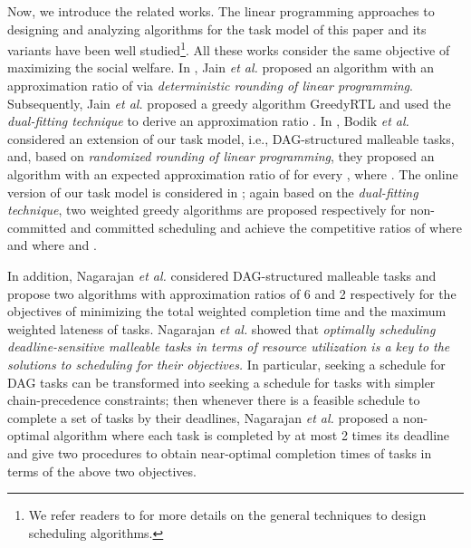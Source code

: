 \documentclass[10pt,journal,compsoc]{IEEEtran}
\begin{document}
Now, we introduce the related works.
The linear programming approaches to designing and analyzing algorithms for the task model of this paper \cite{Jain11a,Jain} and its variants \cite{Lucier,Bodik,Azar} have been well studied\footnote{We refer readers to \cite{Karger,Williamson} for more details on the general techniques to design scheduling algorithms.}. All these works consider the same objective of maximizing the social welfare. In \cite{Jain11a}, Jain {\em et al.} proposed an algorithm with an approximation ratio of  via {\em deterministic rounding of linear programming}. Subsequently, Jain {\em et al.} \cite{Jain} proposed a greedy algorithm GreedyRTL and used the {\em dual-fitting technique} to derive an approximation ratio .
In \cite{Bodik}, Bodik {\em et al.} considered an extension of our task model, i.e., DAG-structured malleable tasks, and, based on {\em randomized rounding of linear programming}, they proposed an algorithm with an expected approximation ratio of  for every , where . The online version of our task model is considered in \cite{Lucier,Azar}; again based on the {\em dual-fitting technique}, two weighted greedy algorithms are proposed respectively for non-committed and committed scheduling and achieve the competitive ratios of  where  \cite{Jain} and  where  and .



In addition, Nagarajan {\em et al.} \cite{Nagarajan} considered DAG-structured malleable tasks and propose two algorithms with approximation ratios of 6 and 2 respectively for the objectives of minimizing the total weighted completion time and the maximum weighted lateness of tasks. Nagarajan {\em et al.} showed that {\em optimally scheduling deadline-sensitive malleable tasks in terms of resource utilization is a key to the solutions to scheduling for their objectives.} In particular, seeking a schedule for DAG tasks can be transformed into seeking a schedule for tasks with simpler chain-precedence constraints; then whenever there is a feasible schedule to complete a set of tasks by their deadlines, Nagarajan {\em et al.} proposed a non-optimal algorithm where each task is completed by at most 2 times its deadline and give two procedures to obtain near-optimal completion times of tasks in terms of the above two objectives.
\end{document}
